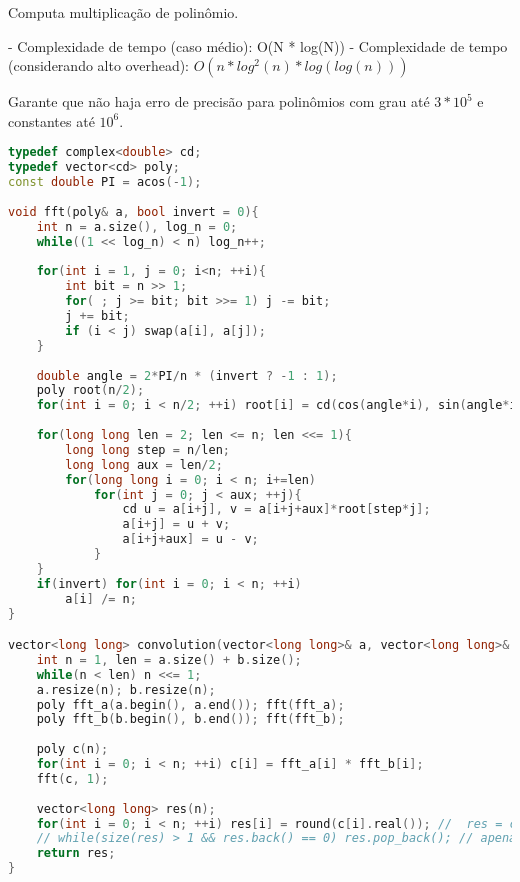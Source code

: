 \documentclass[11pt, a4paper, twoside]{article}
\begin{document}
Computa multiplicação de polinômio.

- Complexidade de tempo (caso médio): O(N * log(N))
- Complexidade de tempo (considerando alto overhead): $O(n * log^2(n) * log(log(n)))$

Garante que não haja erro de precisão para polinômios com grau até $3 * 10^5$ e constantes até $10^6$.
\begin{lstlisting}[language=C++]
typedef complex<double> cd;
typedef vector<cd> poly;
const double PI = acos(-1);
 
void fft(poly& a, bool invert = 0){
    int n = a.size(), log_n = 0;
    while((1 << log_n) < n) log_n++;
    
    for(int i = 1, j = 0; i<n; ++i){
        int bit = n >> 1;
        for( ; j >= bit; bit >>= 1) j -= bit;
        j += bit;
        if (i < j) swap(a[i], a[j]);
    }
    
    double angle = 2*PI/n * (invert ? -1 : 1);
    poly root(n/2);
    for(int i = 0; i < n/2; ++i) root[i] = cd(cos(angle*i), sin(angle*i));
    
    for(long long len = 2; len <= n; len <<= 1){
        long long step = n/len;
        long long aux = len/2;
        for(long long i = 0; i < n; i+=len)
            for(int j = 0; j < aux; ++j){
                cd u = a[i+j], v = a[i+j+aux]*root[step*j];
                a[i+j] = u + v;
                a[i+j+aux] = u - v;
            }
    }
    if(invert) for(int i = 0; i < n; ++i)
        a[i] /= n;
}

vector<long long> convolution(vector<long long>& a, vector<long long>& b){
    int n = 1, len = a.size() + b.size();
    while(n < len) n <<= 1;
    a.resize(n); b.resize(n);
    poly fft_a(a.begin(), a.end()); fft(fft_a);
    poly fft_b(b.begin(), b.end()); fft(fft_b);
    
    poly c(n);
    for(int i = 0; i < n; ++i) c[i] = fft_a[i] * fft_b[i];
    fft(c, 1);
    
    vector<long long> res(n);
    for(int i = 0; i < n; ++i) res[i] = round(c[i].real()); //  res = c[i].real(); se for vector de double
    // while(size(res) > 1 && res.back() == 0) res.pop_back(); // apenas para quando os zeros direita nao importarem
    return res;
}
\end{lstlisting}
\end{document}
